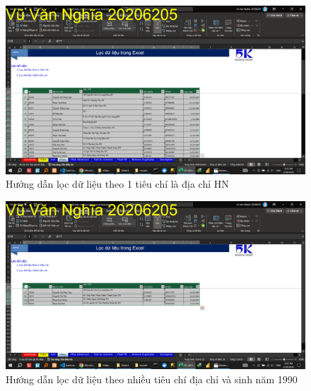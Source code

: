 \documentclass{article}
\begin{document}
\begin{figure}[h]
    \centering
    \includegraphics[scale = 0.15]{Video1/HuongDan/4.png}
    \caption{Hướng dẫn lọc dữ liệu theo 1 tiêu chí là địa chỉ HN}
\end{figure}
\begin{figure}[h]
    \centering
    \includegraphics[scale = 0.15]{Video1/HuongDan/5.png}
    \caption{Hướng dẫn lọc dữ liệu theo nhiều tiêu chí địa chỉ và sinh năm 1990}
\end{figure}
\end{document}

